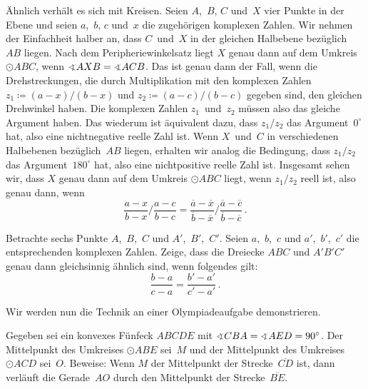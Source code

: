 Ähnlich verhält es sich mit Kreisen. Seien $A$,~$B$, $C$ und~$X$ vier Punkte in der Ebene und seien $a$,~$b$, $c$ und~$x$ die zugehörigen komplexen Zahlen. Wir nehmen der Einfachheit halber an, dass $C$~und~$X$ in der gleichen Halbebene bezüglich~$AB$ liegen. Nach dem Peripheriewinkelsatz liegt $X$ genau dann auf dem Umkreis $\odot ABC$, wenn $\winkel AXB=\winkel ACB$. Das ist genau dann der Fall, wenn die Drehstreckungen, die durch Multiplikation mit den komplexen Zahlen $z_1\coloneqq (a-x)/(b-x)$ und $z_2\coloneqq (a-c)/(b-c)$ gegeben sind, den gleichen Drehwinkel haben. Die komplexen Zahlen $z_1$~und~$z_2$ müssen also das gleiche Argument haben. Das wiederum ist äquivalent dazu, dass $z_1/z_2$ das Argument~$0^\circ$ hat, also eine nichtnegative reelle Zahl ist. Wenn $X$~und~$C$ in verschiedenen Halbebenen bezüglich~$AB$ liegen, erhalten wir analog die Bedingung, dass $z_1/z_2$ das Argument~$180^\circ$ hat, also eine nichtpositive reelle Zahl ist. Insgesamt sehen wir, dass $X$ genau dann auf dem Umkreis $\odot ABC$ liegt, wenn $z_1/z_2$ reell ist, also genau dann, wenn
\begin{equation*}
	\frac{a-x}{b-x}\bigg/\frac{a-c}{b-c}=\frac{\overline{a}-\overline{x}}{\overline{b}-\overline{x}}\bigg/\frac{\overline{a}-\overline{c}}{\overline{b}-\overline{c}}\,.
\end{equation*}

\begin{aufgabe*}
	Betrachte sechs Punkte $A$,~$B$,~$C$ und $A'$,~$B'$,~$C'$. Seien $a$,~$b$,~$c$ und $a'$,~$b'$,~$c'$ die entsprechenden komplexen Zahlen. Zeige, dass die Dreiecke $ABC$ und $A'B'C'$ genau dann gleichsinnig ähnlich sind, wenn folgendes gilt:
	\begin{equation*}
		\frac{b-a}{c-a}=\frac{b'-a'}{c'-a'}\,.
	\end{equation*}
\end{aufgabe*}

Wir werden nun die Technik an einer Olympiadeaufgabe demonstrieren.

\begin{aufgabe*}
	Gegeben sei ein konvexes Fünfeck $ABCDE$ mit $\winkel CBA=\winkel AED=90^\circ$. Der Mittelpunkt des Umkreises $\odot ABE$ sei~$M$ und der Mittelpunkt des Umkreises $\odot ACD$ sei~$O$. Beweise: Wenn $M$ der Mittelpunkt der Strecke~$\overline{CD}$ ist, dann verläuft die Gerade~$AO$ durch den Mittelpunkt der Strecke~$\overline{BE}$.
\end{aufgabe*}


